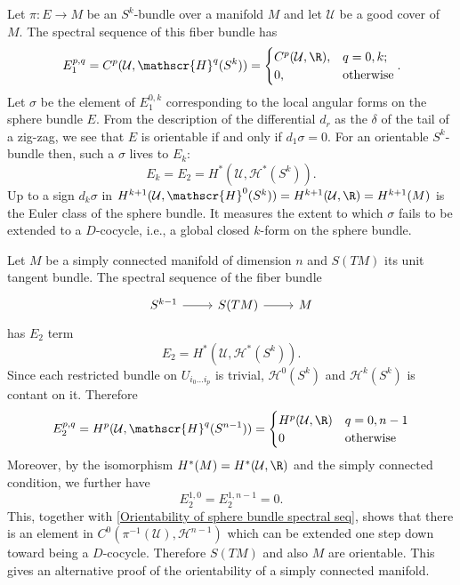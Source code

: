 \begin{example}\label{Orientability of sphere bundle spectral seq}
Let $\pi:E\to M$ be an $S^k$-bundle over a manifold $M$ and let $\mathcal{U}$ be a good cover of $M$. The spectral sequence of this fiber bundle has
\[E_1^{p,q}=C^p(\mathcal{U},\mathscr{H}^q(S^k))=\begin{cases}
C^p(\mathcal{U},\R),&q=0,k;\\
0,&\text{otherwise}
\end{cases}.\]
Let $\sigma$ be the element of $E_1^{0,k}$ corresponding to the local angular forms on the sphere bundle $E$. From the description of the differential $d_r$ as the $\delta$ 
of the tail of a zig-zag, we see that $E$ is orientable if and only if $d_1\sigma=0$. For an orientable $S^k$-bundle then, such a $\sigma$ lives to $E_k$:
\[E_k=E_2=H^*(\mathcal{U},\mathscr{H}^*(S^k)).\]
Up to a sign $d_k\sigma$ in $H^{k+1}(\mathcal{U},\mathscr{H}^0(S^k))=H^{k+1}(\mathcal{U},\R)=H^{k+1}(M)$ is the Euler class of the sphere bundle. It measures the extent 
to which $\sigma$ fails to be extended to a $D$-cocycle, i.e., a global closed $k$-form on the sphere bundle.
\end{example}
\begin{example}
Let $M$ be a simply connected manifold of dimension $n$ and $S(TM)$ its unit tangent bundle. The spectral sequence of the fiber bundle
\[\begin{tikzcd}
S^{k-1}\ar[r]&S(TM)\ar[r]&M
\end{tikzcd}\]
has $E_2$ term
\[E_2=H^*(\mathcal{U},\mathscr{H}^*(S^k)).\]
Since each restricted bundle on $U_{i_0\dots i_p}$ is trivial, $\mathscr{H}^0(S^k)$ and $\mathscr{H}^k(S^k)$ is contant on it. Therefore
\[E_2^{p,q}=H^p(\mathcal{U},\mathscr{H}^q(S^{n-1}))=\begin{cases}
H^p(\mathcal{U},\R)&q=0,n-1\\
0&\text{otherwise}
\end{cases}\]
Moreover, by the isomorphism $H^*(M)=H^*(\mathcal{U},\R)$ and the simply connected condition, we further have
\[E_2^{1,0}=E_2^{1,n-1}=0.\]
This, together with \cref{Orientability of sphere bundle spectral seq}, shows that there is an element in $C^0(\pi^{-1}(\mathcal{U}),\mathscr{H}^{n-1})$ which 
can be extended one step down toward being a $D$-cocycle. Therefore $S(TM)$ and also $M$ are orientable. This gives an alternative proof of the orientability of a simply 
connected manifold.
\end{example}
